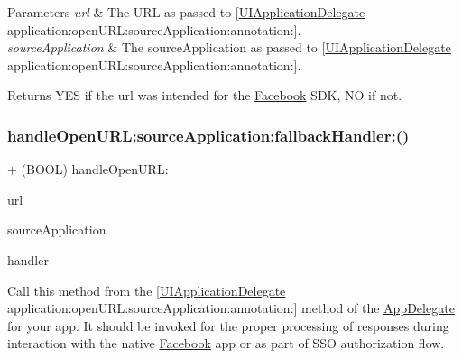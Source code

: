 \begin{DoxyParams}{Parameters}
{\em url} & The U\+RL as passed to \mbox{[}\hyperlink{classUIApplicationDelegate-p}{U\+I\+Application\+Delegate} application\+:open\+U\+R\+L\+:source\+Application\+:annotation\+:\mbox{]}.\\
\hline
{\em source\+Application} & The source\+Application as passed to \mbox{[}\hyperlink{classUIApplicationDelegate-p}{U\+I\+Application\+Delegate} application\+:open\+U\+R\+L\+:source\+Application\+:annotation\+:\mbox{]}.\\
\hline
\end{DoxyParams}
\begin{DoxyReturn}{Returns}
Y\+ES if the url was intended for the \hyperlink{interfaceFacebook}{Facebook} S\+DK, NO if not. 
\end{DoxyReturn}
\mbox{\label{interfaceFBAppCall_ad685be8d03104cb8aa1f2b6ccf770d5d}} 
\subsubsection{\texorpdfstring{handle\+Open\+U\+R\+L\+:source\+Application\+:fallback\+Handler\+:()}{handleOpenURL:sourceApplication:fallbackHandler:()}\hspace{0.1cm}{\footnotesize\ttfamily [1/5]}}
{\footnotesize\ttfamily + (B\+O\+OL) handle\+Open\+U\+R\+L\+: \begin{DoxyParamCaption}\item[{(N\+S\+U\+RL $\ast$)}]{url }\item[{sourceApplication:(N\+S\+String $\ast$)}]{source\+Application }\item[{fallbackHandler:(F\+B\+App\+Call\+Handler)}]{handler }\end{DoxyParamCaption}}

Call this method from the \mbox{[}\hyperlink{classUIApplicationDelegate-p}{U\+I\+Application\+Delegate} application\+:open\+U\+R\+L\+:source\+Application\+:annotation\+:\mbox{]} method of the \hyperlink{classAppDelegate}{App\+Delegate} for your app. It should be invoked for the proper processing of responses during interaction with the native \hyperlink{interfaceFacebook}{Facebook} app or as part of S\+SO authorization flow.


